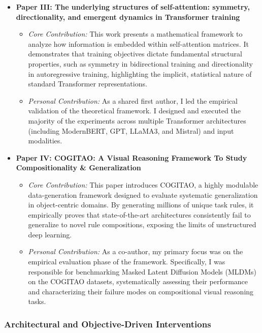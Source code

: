 \begin{itemize}
    \item \textbf{Paper III: The underlying structures of self-attention: symmetry, directionality, and emergent dynamics in Transformer training}
    \begin{itemize}
        \item \textit{Core Contribution:} This work presents a mathematical framework to analyze how information is embedded within self-attention matrices. It demonstrates that training objectives dictate fundamental structural properties, such as symmetry in bidirectional training and directionality in autoregressive training, highlighting the implicit, statistical nature of standard Transformer representations.
        \item \textit{Personal Contribution:} As a shared first author, I led the empirical validation of the theoretical framework. I designed and executed the majority of the experiments across multiple Transformer architectures (including ModernBERT, GPT, LLaMA3, and Mistral) and input modalities.
    \end{itemize}

    \item \textbf{Paper IV: COGITAO: A Visual Reasoning Framework To Study Compositionality \& Generalization}
    \begin{itemize}
        \item \textit{Core Contribution:} This paper introduces COGITAO, a highly modulable data-generation framework designed to evaluate systematic generalization in object-centric domains. By generating millions of unique task rules, it empirically proves that state-of-the-art architectures consistently fail to generalize to novel rule compositions, exposing the limits of unstructured deep learning.
        \item \textit{Personal Contribution:} As a co-author, my primary focus was on the empirical evaluation phase of the framework. Specifically, I was responsible for benchmarking Masked Latent Diffusion Models (MLDMs) on the COGITAO datasets, systematically assessing their performance and characterizing their failure modes on compositional visual reasoning tasks.
    \end{itemize}
\end{itemize}

\subsubsection{Architectural and Objective-Driven Interventions}

